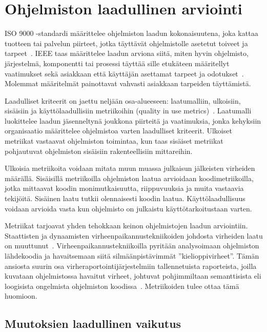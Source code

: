 \documentclass[finnish]{../tktltiki2}
\theoremstyle{definition}
\theoremstyle{remark}
\begin{document}
\section{Ohjelmiston laadullinen arviointi}

ISO 9000 -standardi määrittelee ohjelmiston laadun kokonaisuutena, joka kattaa tuotteen tai palvelun piirteet, jotka 
täyttävät ohjelmistolle asetetut toiveet ja tarpeet~\cite{ISO9000}. IEEE taas määrittelee laadun arviona siitä, miten hyvin 
ohjelmisto, järjestelmä, komponentti tai prosessi täyttää sille etukäteen määritellyt vaatimukset sekä asiakkaan että 
käyttäjän asettamat tarpeet ja odotukset~\cite{IEEE1074}. Molemmat määritelmät painottavat vahvasti asiakkaan tarpeiden 
täyttämistä.

    Laadulliset kriteerit on jaettu neljään osa-alueeseen: laatumalliin, ulkoisiin, sisäisiin ja käyttölaadullisiin 
metriikoihin (quality in use metrics)~\cite{ISO25010}. Laatumalli luokittelee laadun jäsenneltynä joukkona piirteitä ja 
vaatimuksia, jonka kehyksiin organisaatio määrittelee ohjelmistoa varten laadulliset kriteerit. Ulkoiset metriikat 
vastaavat ohjelmiston toimintaa, kun taas sisäiset metriikat pohjautuvat ohjelmiston sisäisiin rakenteellisiin 
mittareihin.

    Ulkoisia metriikoita voidaan mitata muun muassa julkaisun jälkeisten virheiden määrällä. Sisäisillä metriikoilla 
ohjelmiston laatua arvioidaan koodimetriikoilla, jotka mittaavat koodin monimutkaisuutta, riippuvuuksia ja muita 
vastaavia tekijöitä. Sisäinen laatu tutkii olennaisesti koodin laatua. Käyttölaadullisuus voidaan arvioida vasta kun 
ohjelmisto on julkaistu käyttötarkoitustaan varten.

    Metriikat tarjoavat yhden tehokkaan keinon ohjelmistojen laadun arviointiin. Staattisten ja dynaamisten 
virheenpaikannustekniikoiden johdosta virheiden laatu on muuttunut~\cite{ZN08}. Virheenpaikannustekniikoilla pyritään 
analysoimaan ohjelmiston lähdekoodia ja havaitsemaan siitä silmäänpistävimmät ''kielioppivirheet''. Tämän ansiosta 
suurin osa virheraportointijärjestelmiin tallennetuista raporteista, joilla kuvataan ohjelmistossa havaitut virheet, 
johtuvat pohjimmiltaan semanttisista eli loogisista ongelmista ohjelmiston koodissa~\cite{ZN08}. Metriikoiden tulee 
ottaa tämä huomioon.

\subsection{Muutoksien laadullinen vaikutus}
\end{document}
